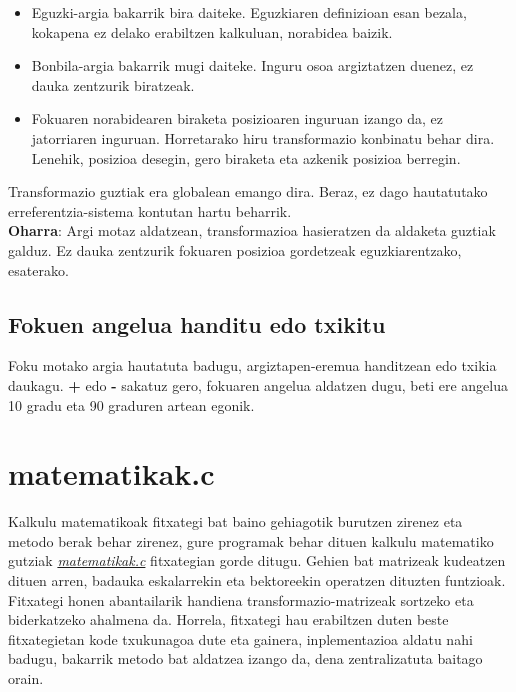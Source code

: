 \documentclass[12pt]{article}
\newcommand{\fitxategi}[1] {\underline{\textit{#1}}}
\newcommand{\tekla}[1] {\textbf{#1}}
\begin{document}
\begin{itemize}
\item Eguzki-argia bakarrik bira daiteke. Eguzkiaren definizioan esan bezala, kokapena ez delako erabiltzen kalkuluan, norabidea baizik.

\item Bonbila-argia bakarrik mugi daiteke. Inguru osoa argiztatzen duenez, ez dauka zentzurik biratzeak.

\item Fokuaren norabidearen biraketa posizioaren inguruan izango da, ez jatorriaren inguruan. Horretarako hiru transformazio konbinatu behar dira. Lenehik, posizioa desegin, gero biraketa eta azkenik posizioa berregin.

\end{itemize}

Transformazio guztiak era globalean emango dira. Beraz, ez dago hautatutako erreferentzia-sistema kontutan hartu beharrik.\\

\textbf{Oharra}: Argi motaz aldatzean, transformazioa hasieratzen da aldaketa guztiak galduz. Ez dauka zentzurik fokuaren posizioa gordetzeak eguzkiarentzako, esaterako.

\subsection{Fokuen angelua handitu edo txikitu}

Foku motako argia hautatuta badugu, argiztapen-eremua handitzean edo txikia daukagu. \tekla{+} edo \tekla{-} sakatuz gero, fokuaren angelua aldatzen dugu, beti ere angelua 10 gradu eta 90 graduren artean egonik.

\section{matematikak.c}\label{matematikak}

Kalkulu matematikoak fitxategi bat baino gehiagotik burutzen zirenez eta metodo berak behar zirenez, gure programak behar dituen kalkulu matematiko gutziak \fitxategi{matematikak.c} fitxategian gorde ditugu. Gehien bat matrizeak kudeatzen dituen arren, badauka eskalarrekin eta bektoreekin operatzen dituzten funtzioak.\\

Fitxategi honen abantailarik handiena transformazio-matrizeak sortzeko eta biderkatzeko ahalmena da. Horrela, fitxategi hau erabiltzen duten beste fitxategietan kode txukunagoa dute eta gainera, inplementazioa aldatu nahi badugu, bakarrik metodo bat aldatzea izango da, dena zentralizatuta baitago orain.\\
\end{document}
